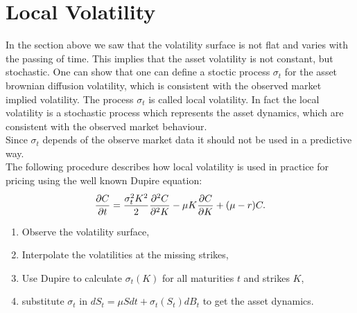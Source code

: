 \section{Local Volatility}
In the section above we saw that the volatility surface is not flat and varies with the passing of time. This implies that the asset volatility is not constant, but stochastic. One can show that one can define a stoctic process $\sigma_t$ for the asset brownian diffusion volatility, which is consistent with the observed market implied volatility. The process $\sigma_t$ is called local volatility. In fact the local volatility is a stochastic process which represents the asset dynamics, which are consistent with the observed market behaviour.\\
Since $\sigma_t$ depends of the observe market data it should not be used in a predictive way.\\
The following procedure describes how local volatility is used in practice for pricing using the well known Dupire equation:
$$\frac{\partial C}{\partial t}=\frac{\sigma_t^2 K^2}{2}\frac{\partial^2 C}{\partial^2 K}-\mu K \frac{\partial C}{\partial K}+(\mu-r)C.$$
\begin{enumerate}
\item Observe the volatility surface,
\item Interpolate the volatilities at the missing strikes,
\item Use Dupire to calculate $\sigma_t(K)$ for all maturities $t$ and strikes $K$,
\item substitute $\sigma_t$ in $dS_t=\mu Sdt + \sigma_t(S_t)dB_t$ to get the asset dynamics.
\end{enumerate}


